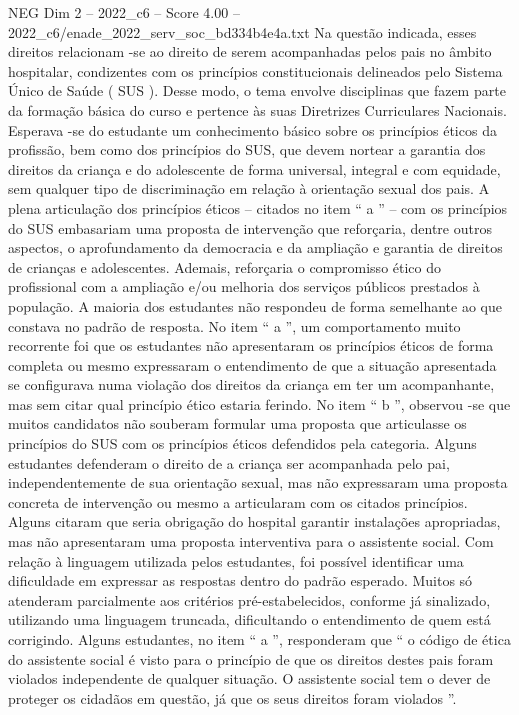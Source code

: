\begin{textsample}{NEG Dim 2 – 2022\_c6 – Score 4.00 – 2022\_c6/enade\_2022\_serv\_soc\_bd334b4e4a.txt}
Na questão indicada, esses direitos relacionam -se ao direito de serem acompanhadas pelos pais no âmbito hospitalar, condizentes com os princípios constitucionais delineados pelo Sistema Único de Saúde ( SUS ).
Desse modo, o tema envolve disciplinas que fazem parte da formação básica do curso e pertence às suas Diretrizes Curriculares Nacionais.
Esperava -se do estudante um conhecimento básico sobre os princípios éticos da profissão, bem como dos princípios do SUS, que devem nortear a garantia dos direitos da criança e do adolescente de forma universal, integral e com equidade, sem qualquer tipo de discriminação em relação à orientação sexual dos pais.
A plena articulação dos princípios éticos – citados no item “ a ” – com os princípios do SUS embasariam uma proposta de intervenção que reforçaria, dentre outros aspectos, o aprofundamento da democracia e da ampliação e garantia de direitos de crianças e adolescentes.
Ademais, reforçaria o compromisso ético do profissional com a ampliação e/ou melhoria dos serviços públicos prestados à população.
A maioria dos estudantes não respondeu de forma semelhante ao que constava no padrão de resposta.
No item “ a ”, um comportamento muito recorrente foi que os estudantes não apresentaram os princípios éticos de forma completa ou mesmo expressaram o entendimento de que a situação apresentada se configurava numa violação dos direitos da criança em ter um acompanhante, mas sem citar qual princípio ético estaria ferindo.
No item “ b ”, observou -se que muitos candidatos não souberam formular uma proposta que articulasse os princípios do SUS com os princípios éticos defendidos pela categoria.
Alguns estudantes defenderam o direito de a criança ser acompanhada pelo pai, independentemente de sua orientação sexual, mas não expressaram uma proposta concreta de intervenção ou mesmo a articularam com os citados princípios.
Alguns citaram que seria obrigação do hospital garantir instalações apropriadas, mas não apresentaram uma proposta interventiva para o assistente social.
Com relação à linguagem utilizada pelos estudantes, foi possível identificar uma dificuldade em expressar as respostas dentro do padrão esperado.
Muitos só atenderam parcialmente aos critérios pré-estabelecidos, conforme já sinalizado, utilizando uma linguagem truncada, dificultando o entendimento de quem está corrigindo.
Alguns estudantes, no item “ a ”, responderam que “ o código de ética do assistente social é visto para o princípio de que os direitos destes pais foram violados independente de qualquer situação.
O assistente social tem o dever de proteger os cidadãos em questão, já que os seus direitos foram violados ”.

\end{textsample}
